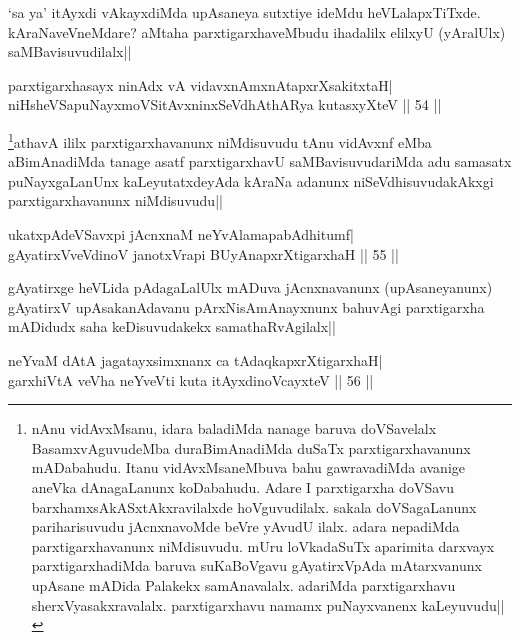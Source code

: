 \begin{artha} 
`sa ya' itAyxdi vAkayxdiMda upAsaneya sutxtiye ideMdu heVLalapxTiTxde. 
kAraNaveVneMdare? aMtaha parxtigarxhaveMbudu ihadalilx elilxyU 
(yAralUlx) saMBavisuvudilalx||
\end{artha}


\begin{shl}
parxtigarxhasayx ninAdx vA vidavxnAmxnAtapxrXsakitxtaH| \\
niHsheVSapuNayxmoVSitAvxninxSeVdhAthARya kutasxyXteV \hfill ||  54 || 
\end{shl}

\begin{artha} 
\footnote[1]{nAnu vidAvxMsanu, idara baladiMda nanage baruva 
doVSavelalx BasamxvAguvudeMba duraBimAnadiMda duSaTx 
parxtigarxhavanunx mADabahudu. Itanu vidAvxMsaneMbuva bahu 
gawravadiMda avanige aneVka dAnagaLanunx koDabahudu. Adare I 
parxtigarxha doVSavu barxhamxsAkASxtAkxravilalxde hoVguvudilalx. 
sakala doVSagaLanunx pariharisuvudu jAcnxnavoMde beVre yAvudU ilalx. 
adara nepadiMda parxtigarxhavanunx niMdisuvudu. mUru loVkadaSuTx 
aparimita darxvayx parxtigarxhadiMda baruva suKaBoVgavu gAyatirxVpAda 
mAtarxvanunx upAsane mADida Palakekx samAnavalalx. adariMda 
parxtigarxhavu sherxVyasakxravalalx. parxtigarxhavu namamx 
puNayxvanenx kaLeyuvudu||}athavA ililx parxtigarxhavanunx niMdisuvudu tAnu 
vidAvxnf eMba aBimAnadiMda tanage asatf parxtigarxhavU 
saMBavisuvudariMda adu samasatx puNayxgaLanUnx kaLeyutatxdeyAda kAraNa 
adanunx niSeVdhisuvudakAkxgi parxtigarxhavanunx niMdisuvudu||
\end{artha}

\begin{shl}
ukatxpAdeVSavxpi jAcnxnaM neYvAlamapabAdhitumf| \\
gAyatirxVveVdinoV janotxVrapi BUyAnapxrXtigarxhaH \hfill ||  55 || 
\end{shl}

\begin{artha} 
gAyatirxge heVLida pAdagaLalUlx mADuva jAcnxnavanunx (upAsaneyanunx) 
gAyatirxV upAsakanAdavanu pArxNisAmAnayxnunx bahuvAgi parxtigarxha 
mADidudx saha keDisuvudakekx samathaRvAgilalx||
\end{artha}


\begin{shl}
neYvaM dAtA jagatayxsimxnanx ca tAdaqkapxrXtigarxhaH| \\
garxhiVtA veVha neYveVti kuta itAyxdinoVcayxteV \hfill ||  56 ||
\end{shl}


